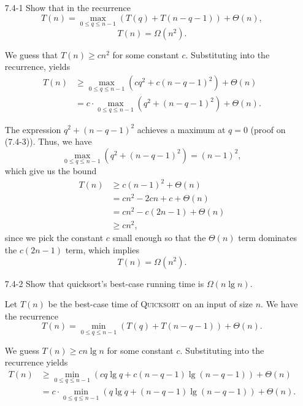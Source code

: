 \documentclass{report}
\makeatletter
\renewenvironment{framed}{%
 \def\FrameCommand##1{\hskip\@totalleftmargin
 \fboxsep=\FrameSep\fbox{##1}}%
 \MakeFramed {\advance\hsize-\width
   \@totalleftmargin\z@ \linewidth\hsize
   \@setminipage}}%
 {\par\unskip\endMakeFramed}
\makeatother
\begin{document}
\begin{enumerate}

\item[7.4{-}1]{Show that in the recurrence
\[
  T(n) = \max_{0 \le q \le n - 1}(T(q) + T(n - q - 1)) + \Theta(n),
\]
\[
  T(n) = \Omega(n^2).
\]}

\begin{framed}
We guess that $T(n) \ge cn^2$ for some constant $c$. Substituting into the
recurrence, yields
\begin{equation*}
\begin{aligned}
  T(n) &\ge \max_{0 \le q \le n - 1}(cq^2 + c(n - q - 1)^2) + \Theta(n)\\
       &=   c \cdot \max_{0 \le q \le n - 1}(q^2 + (n - q - 1)^2) + \Theta(n).
\end{aligned}
\end{equation*}

The expression $q^2 + (n - q - 1)^2$ achieves a maximum at $q = 0$ (proof on
(7.4-3)). Thus, we have
\[
  \max_{0 \le q \le n - 1}(q^2 + (n - q - 1)^2) = (n - 1)^2,
\]
which give us the bound
\begin{equation*}
\begin{aligned}
  T(n) &\ge c (n - 1)^2 + \Theta(n)\\
       &=   cn^2 - 2cn + c + \Theta(n)\\
       &=   cn^2 - c(2n - 1) + \Theta(n)\\
       &\ge cn^2,
\end{aligned}
\end{equation*}
since we pick the constant $c$ small enough so that the $\Theta(n)$ term
dominates the $c(2n - 1)$ term, which implies
\[
  T(n) = \Omega(n^2).
\]
\end{framed}

\item[7.4{-}2]{Show that quicksort's best-case running time is $\Omega(n \lg n)$.}

\begin{framed}
Let $T(n)$ be the best-case time of \textsc{Quicksort} on an input of size
$n$. We have the recurrence
\[
  T(n) = \min_{0 \le q \le n - 1}(T(q) + T(n - q - 1)) + \Theta(n).
\]

We guess $T(n) \ge cn \lg n$ for some constant $c$. Substituting into the
recurrence yields
\begin{equation*}
\begin{aligned}
  T(n) &\ge \min_{0 \le q \le n - 1}(cq \lg q + c(n - q - 1) \lg (n - q - 1)) + \Theta(n)\\
       &=   c \cdot \min_{0 \le q \le n - 1}(q \lg q + (n - q - 1) \lg (n - q - 1)) + \Theta(n).
\end{aligned}
\end{equation*}


\end{framed}
\end{enumerate}
\end{document}
